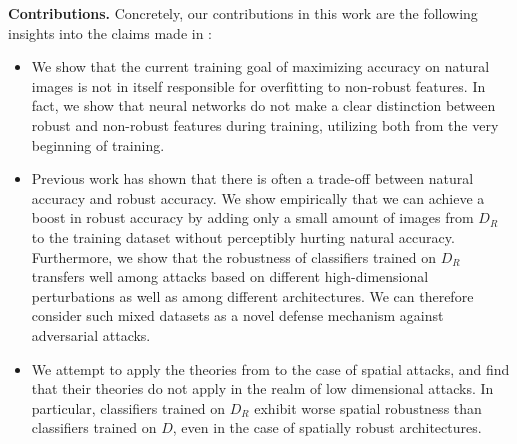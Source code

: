 \textbf{Contributions.} Concretely, our contributions in this work are the following insights into the claims made in \cite{Ilyas2019}: 
\vspace{-7pt}
\begin{itemize}
    \itemsep-0.3em
    \item We show that the current training goal of maximizing accuracy on natural images is not in itself responsible for overfitting to non-robust features. In fact, we show that neural networks do not make a clear distinction between robust and non-robust features during training, utilizing both from the very beginning of training.
    \item Previous work \cite{Zhang19} has shown that there is often a trade-off between natural accuracy and robust accuracy. We show empirically that we can achieve a boost in robust accuracy by adding only a small amount of images from $D_R$ to the training dataset without perceptibly hurting natural accuracy. Furthermore, we show that the robustness of classifiers trained on $D_R$ transfers well among attacks based on different high-dimensional perturbations as well as among different architectures. We can therefore consider such mixed datasets as a novel defense mechanism against adversarial attacks.
    \item We attempt to apply the theories from \cite{Ilyas2019} to the case of spatial attacks, and find that their theories do not apply in the realm of low dimensional attacks. In particular, classifiers trained on $D_R$ exhibit worse spatial robustness than classifiers trained on $D$, even in the case of spatially robust architectures.
\end{itemize}
